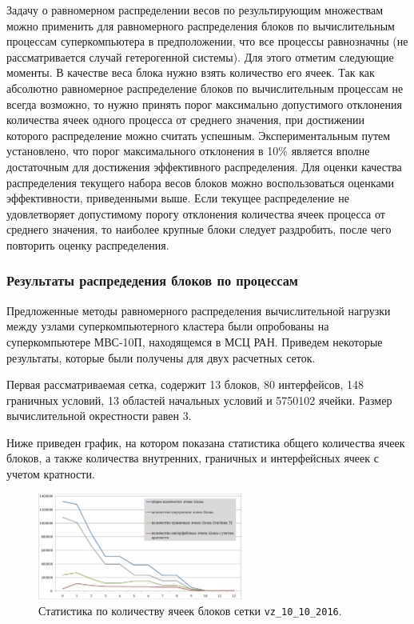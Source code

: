 Задачу о равномерном распределении весов по результирующим множествам можно применить для равномерного распределения блоков по вычислительным процессам суперкомпьютера в предположении, что все процессы равнозначны (не рассматривается случай гетерогенной системы).
Для этого отметим следующие моменты.
В качестве веса блока нужно взять количество его ячеек.
Так как абсолютно равномерное распределение блоков по вычислительным процессам не всегда возможно, то нужно принять порог максимально допустимого отклонения количества ячеек одного процесса от среднего значения, при достижении которого распределение можно считать успешным.
Экспериментальным путем установлено, что порог максимального отклонения в 10\% является вполне достаточным для достижения эффективного распределения.
Для оценки качества распределения текущего набора весов блоков можно воспользоваться оценками эффективности, приведенными выше.
Если текущее распределение не удовлетворяет допустимому порогу отклонения количества ячеек процесса от среднего значения, то наиболее крупные блоки следует раздробить, после чего повторить оценку распределения.

\subsubsection{Результаты распредедения блоков по процессам}

Предложенные методы равномерного распределения вычислительной нагрузки между узлами суперкомпьютерного кластера были опробованы на суперкомпьютере МВС-10П, находящемся в МСЦ РАН.
Приведем некоторые результаты, которые были получены для двух расчетных сеток.

Первая рассматриваемая сетка, содержит 13 блоков, 80 интерфейсов, 148 граничных условий, 13 областей начальных условий и 5750102 ячейки.
Размер вычислительной окрестности равен 3.

Ниже приведен график, на котором показана статистика общего количества ячеек блоков, а также количества внутренних, граничных и интерфейсных ячеек с учетом кратности.

\begin{figure}[ht]
	\centering
	\includegraphics[width=0.6\textwidth]{./pics/text_2_withcut/chart3.jpg}
	\caption{Статистика по количеству ячеек блоков сетки \texttt{vz\_10\_10\_2016}.}
	\label{fig:text_2_withcut_chart3}
\end{figure}

